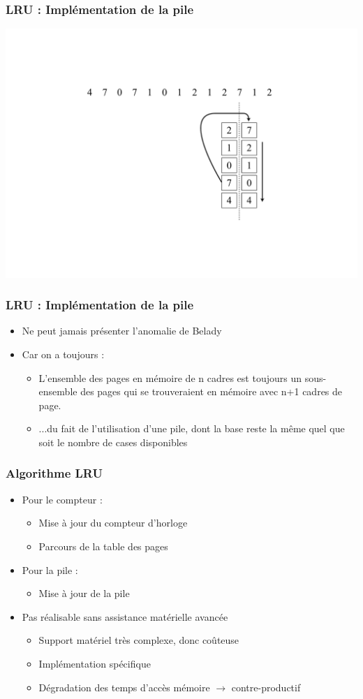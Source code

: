 \begin{frame}
\frametitle{LRU : Implémentation de la pile}
\includegraphics[width=.8\textwidth]{../illustration/remplacement_lru_pile.pdf}
\end{frame}


\begin{frame}
\frametitle{LRU : Implémentation de la pile}
\begin{itemize}
\item Ne peut jamais présenter l'anomalie de Belady
\item Car on a toujours :
\begin{itemize}
\item L'ensemble des pages en mémoire de n cadres est toujours un sous-ensemble des pages qui se trouveraient en mémoire avec n+1 cadres de page.
\item ...du fait de l'utilisation d'une pile, dont la base reste la même quel que soit le nombre de cases disponibles
\end{itemize}
\end{itemize}
\end{frame}


\begin{frame}
\frametitle{Algorithme LRU}
\begin{itemize}
\item Pour le compteur :
\begin{itemize}
\item Mise à jour du compteur d'horloge
\item Parcours de la table des pages
\end{itemize}
\item Pour la pile :
\begin{itemize}
\item Mise à jour de la pile
\end{itemize}
\item Pas réalisable sans assistance matérielle avancée
\begin{itemize}
\item Support matériel très complexe, donc coûteuse
\item Implémentation spécifique
\item Dégradation des temps d'accès mémoire $\rightarrow$ contre-productif
\end{itemize}
\end{itemize}
\end{frame}


